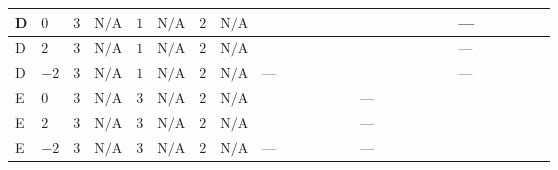 \documentclass[8pt]{article}
\begin{document}
\begin{landscape}
\begin{longtable}{@{}llcccccc >{\raggedright\arraybackslash}p{0.21\linewidth} >{\raggedright\arraybackslash}p{0.21\linewidth} >{\raggedright\arraybackslash}p{0.21\linewidth}@{}}
\midrule
D & $0$ & $3$ & $\text{N/A}$ & $1$ & $\text{N/A}$ & $2$ & $\text{N/A}$ & \scriptsize\adjustbox{max width=\linewidth}{$\begin{gathered} -6 {g_1}^2 {m_2^2}\end{gathered}$} & \scriptsize\adjustbox{max width=\linewidth}{$\begin{gathered} +6 {\lambda_{12}^{(1)}} {m_1^2}\end{gathered}$} & --- \\
\midrule
D & $2$ & $3$ & $\text{N/A}$ & $1$ & $\text{N/A}$ & $2$ & $\text{N/A}$ & \scriptsize\adjustbox{max width=\linewidth}{$\begin{gathered} -24 {g_1}^2 {m_2^2}\end{gathered}$} & \scriptsize\adjustbox{max width=\linewidth}{$\begin{gathered} +6 {\lambda_{12}^{(1)}} {m_1^2}\end{gathered}$} & --- \\
\midrule
D & $-2$ & $3$ & $\text{N/A}$ & $1$ & $\text{N/A}$ & $2$ & $\text{N/A}$ & --- & \scriptsize\adjustbox{max width=\linewidth}{$\begin{gathered} +6 {\lambda_{12}^{(1)}} {m_1^2}\end{gathered}$} & --- \\
\midrule
E & $0$ & $3$ & $\text{N/A}$ & $3$ & $\text{N/A}$ & $2$ & $\text{N/A}$ & \scriptsize\adjustbox{max width=\linewidth}{$\begin{gathered} -6 {g_1}^2 {m_2^2}\end{gathered}$} & --- & \scriptsize\adjustbox{max width=\linewidth}{$\begin{gathered} +{m_2^2} (8 {\lambda_{S_2}^{(1)}}+4 {\lambda_{S_2}^{(A)}})\end{gathered}$} \\
\midrule
E & $2$ & $3$ & $\text{N/A}$ & $3$ & $\text{N/A}$ & $2$ & $\text{N/A}$ & \scriptsize\adjustbox{max width=\linewidth}{$\begin{gathered} -24 {g_1}^2 {m_2^2}\end{gathered}$} & --- & \scriptsize\adjustbox{max width=\linewidth}{$\begin{gathered} +{m_2^2} (8 {\lambda_{S_2}^{(1)}}+4 {\lambda_{S_2}^{(A)}})\end{gathered}$} \\
\midrule
E & $-2$ & $3$ & $\text{N/A}$ & $3$ & $\text{N/A}$ & $2$ & $\text{N/A}$ & --- & --- & \scriptsize\adjustbox{max width=\linewidth}{$\begin{gathered} +{m_2^2} (8 {\lambda_{S_2}^{(1)}}+4 {\lambda_{S_2}^{(A)}})\end{gathered}$} \\

\end{longtable}
\end{landscape}
\end{document}
